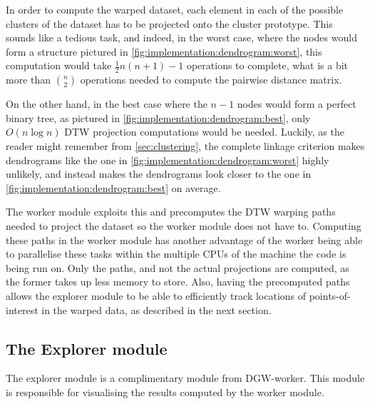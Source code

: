 \documentclass[parskip]{cs4rep}
\begin{document}
In order to compute the warped dataset, each element in each of the possible clusters of the dataset has to be projected onto the cluster prototype. This sounds like a tedious task, and indeed, in the worst case,  where the nodes would form a structure pictured in \autoref{fig:implementation:dendrogram:worst}, this computation would take $\frac{1}{2} n(n+1) - 1$ operations to complete, what is a bit more than ${n \choose 2}$ operations needed to compute the pairwise distance matrix. 

On the other hand, in the best case where the $n-1$ nodes would form a perfect binary tree, as pictured in \autoref{fig:implementation:dendrogram:best}, only $O(n \log n)$ DTW projection computations would be needed. Luckily, as the reader might remember from \autoref{sec:clustering}, the complete linkage criterion makes dendrograms like the one in \autoref{fig:implementation:dendrogram:worst} highly unlikely, and instead makes the dendrograms look closer to the one in \autoref{fig:implementation:dendrogram:best} on average. 

The worker module exploits this and precomputes the DTW warping paths needed to project the dataset so the worker module does not have to. Computing these paths in the worker module has another advantage of the worker being able to parallelise these tasks within the multiple CPUs of the machine the code is being run on. Only the paths, and not the actual projections are computed, as the former takes up less memory to store. Also, having the precomputed paths allows the explorer module to be able to efficiently track locations of points-of-interest in the warped data, as described in the next section.

\subsection{The Explorer module}

The explorer module is a complimentary module from DGW-worker. This module is responsible for
visualising the results computed by the worker module.
\end{document}

